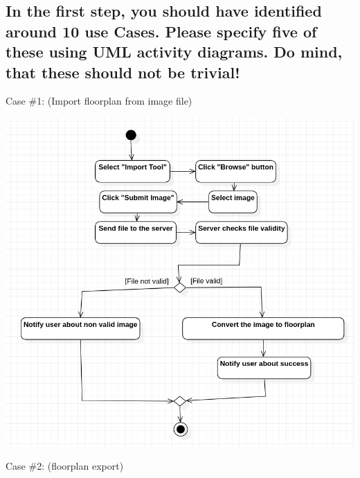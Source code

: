 		\clearpage
			
			
		\subsection{In the first step, you should have identified around 10 use Cases. Please specify
			five of these using UML activity diagrams. Do mind, that these should not be
			trivial!}
		
            \noindent Case \#1:
            (Import floorplan from image file)
            
            \includegraphics[width=\textwidth]{images/j_UseCase1.png}
            
            \newpage
            \noindent Case \#2:
            (floorplan export)
            
